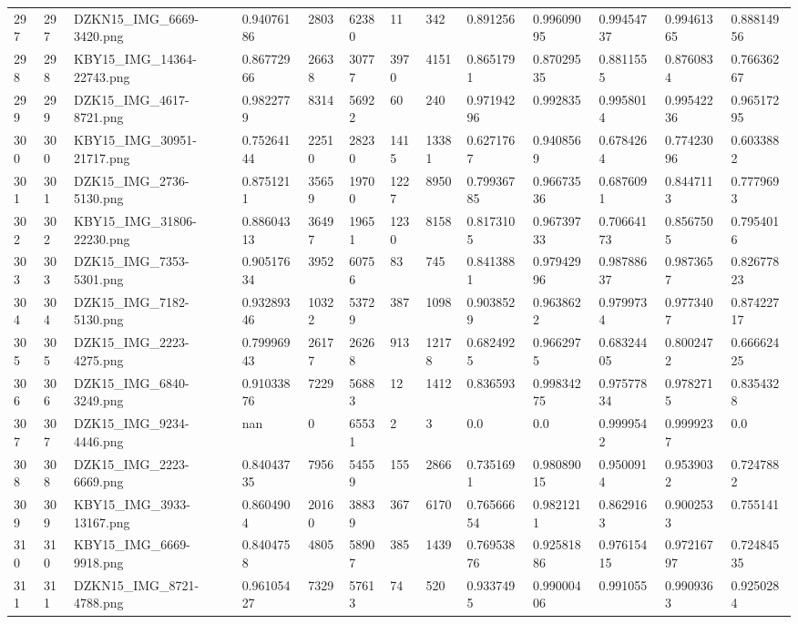 \documentclass[11pt, a4paper, twoside]{report}
\begin{document}
\begin{longtable}[c]{@{}lllllllllllll@{}}
297 & 297 & DZKN15\_IMG\_6669-3420.png & 0.94076186 & 2803 & 62380 & 11 & 342 & 0.891256 & 0.99609095 & 0.99454737 & 0.99461365 & 0.88814956 \\
298 & 298 & KBY15\_IMG\_14364-22743.png & 0.86772966 & 26638 & 30777 & 3970 & 4151 & 0.8651791 & 0.87029535 & 0.8811555 & 0.8760834 & 0.76636267 \\
299 & 299 & DZK15\_IMG\_4617-8721.png & 0.9822779 & 8314 & 56922 & 60 & 240 & 0.97194296 & 0.992835 & 0.9958014 & 0.99542236 & 0.96517295 \\
300 & 300 & KBY15\_IMG\_30951-21717.png & 0.75264144 & 22510 & 28230 & 1415 & 13381 & 0.6271767 & 0.9408569 & 0.6784264 & 0.77423096 & 0.6033882 \\
301 & 301 & DZK15\_IMG\_2736-5130.png & 0.8751211 & 35659 & 19700 & 1227 & 8950 & 0.79936785 & 0.96673536 & 0.6876091 & 0.8447113 & 0.7779693 \\
302 & 302 & KBY15\_IMG\_31806-22230.png & 0.88604313 & 36497 & 19651 & 1230 & 8158 & 0.8173105 & 0.96739733 & 0.70664173 & 0.8567505 & 0.7954016 \\
303 & 303 & DZK15\_IMG\_7353-5301.png & 0.90517634 & 3952 & 60756 & 83 & 745 & 0.8413881 & 0.97942996 & 0.98788637 & 0.9873657 & 0.82677823 \\
304 & 304 & DZK15\_IMG\_7182-5130.png & 0.93289346 & 10322 & 53729 & 387 & 1098 & 0.9038529 & 0.9638622 & 0.9799734 & 0.9773407 & 0.87422717 \\
305 & 305 & DZK15\_IMG\_2223-4275.png & 0.79996943 & 26177 & 26268 & 913 & 12178 & 0.6824925 & 0.9662975 & 0.68324405 & 0.8002472 & 0.66662425 \\
306 & 306 & DZK15\_IMG\_6840-3249.png & 0.91033876 & 7229 & 56883 & 12 & 1412 & 0.836593 & 0.99834275 & 0.97577834 & 0.9782715 & 0.8354328 \\
307 & 307 & DZK15\_IMG\_9234-4446.png & nan & 0 & 65531 & 2 & 3 & 0.0 & 0.0 & 0.9999542 & 0.9999237 & 0.0 \\
308 & 308 & DZK15\_IMG\_2223-6669.png & 0.84043735 & 7956 & 54559 & 155 & 2866 & 0.7351691 & 0.98089015 & 0.9500914 & 0.9539032 & 0.7247882 \\
309 & 309 & KBY15\_IMG\_3933-13167.png & 0.8604904 & 20160 & 38839 & 367 & 6170 & 0.76566654 & 0.9821211 & 0.8629163 & 0.9002533 & 0.755141 \\
310 & 310 & KBY15\_IMG\_6669-9918.png & 0.8404758 & 4805 & 58907 & 385 & 1439 & 0.76953876 & 0.92581886 & 0.97615415 & 0.97216797 & 0.72484535 \\
311 & 311 & DZKN15\_IMG\_8721-4788.png & 0.96105427 & 7329 & 57613 & 74 & 520 & 0.9337495 & 0.99000406 & 0.991055 & 0.9909363 & 0.9250284 \\

\end{longtable}
\end{document}
